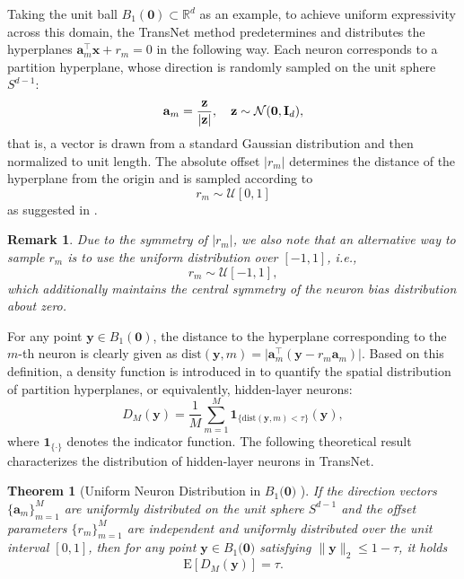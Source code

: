 \documentclass{article}
\newcommand{\ba}{\mathbf{a}}
\newcommand{\bx}{\mathbf{x}}
\newcommand{\by}{\mathbf{y}}
\newtheorem{theorem}{Theorem}
\newtheorem{remark}{Remark}
\begin{document}
Taking the unit ball $B_1(\mathbf{0}) \subset \mathbb{R}^d$ as an example, to achieve uniform expressivity across this domain, the TransNet method \cite{TransNet} predetermines and distributes the hyperplanes $\mathbf{a}_m^\top \bx + r_m = 0$ in the following way. Each neuron corresponds to a partition hyperplane, whose direction is randomly sampled on the unit sphere $S^{d-1}$:
\begin{equation}\label{eq:sample_a}
\mathbf{a}_m = \frac{\mathbf{z}}{|\mathbf{z}|}, \quad \mathbf{z} \sim \mathcal{N}(\mathbf{0}, {\bf I}_d),
\end{equation}
that is, a vector is drawn from a standard Gaussian distribution and then normalized to unit length. The absolute offset $|r_m|$ determines the distance of the hyperplane from the origin and is sampled according to
\begin{equation}\label{unif1}
r_m \sim \mathcal{U}[0, 1]
\end{equation}
as suggested in \cite{TransNet}.

\begin{remark}
Due to the symmetry of $|r_m|$,
we also note that an alternative way to sample $r_m$ is to use the uniform distribution over $[-1,1]$, i.e.,
\begin{equation}\label{unif2}
r_m \sim \mathcal{U}[-1, 1],
\end{equation}
which additionally maintains the central symmetry of the neuron bias distribution about zero.
\end{remark}

For any point $\by \in B_1(\mathbf{0})$, the distance to the hyperplane corresponding to the $m$-th neuron is clearly given as
$\text{dist}(\by, m) = \big|\ba_m^\top (\by - r_m \ba_m)\big|$.
Based on this definition, a density function is introduced in \cite{TransNet} to quantify the spatial distribution of partition hyperplanes, or equivalently, hidden-layer neurons:
\begin{equation}
D_M(\by) = \frac{1}{M} \textstyle\sum\limits_{m=1}^{M} \mathbf{1}_{\{\text{dist}(\by, m) < \tau\}}(\by),
\end{equation}
where $\mathbf{1}_{\{\cdot\}}$ denotes the indicator function. The following theoretical result characterizes the distribution of hidden-layer neurons in TransNet.

\begin{theorem}[Uniform Neuron Distribution in $B_1(\mathbf{0)}$ \cite{TransNet}]\label{thm:uniform_neuron}
If the direction vectors $\{\ba_m\}_{m=1}^M$ are uniformly distributed on the unit sphere $S^{d-1}$ and the offset parameters $\{r_m\}_{m=1}^M$ are independent and uniformly distributed over the unit interval $[0,1]$, then for any point $\by\in B_1(\mathbf{0)}$ satisfying $\|\by\|_2 \leq 1 - \tau$, it holds
\begin{equation}
\mathrm{E}[D_M(\by)] = \tau.
\end{equation}
\end{theorem}
\end{document}
